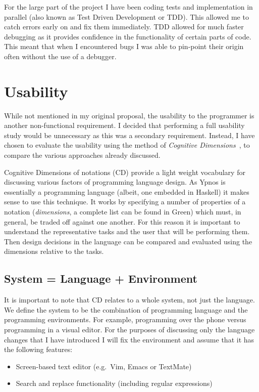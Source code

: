 \documentclass[12pt,a4paper,twoside]{scrbook}
\begin{document}
For the large part of the project I have been coding tests and
implementation in parallel (also known as Test Driven Development or
TDD). This allowed me to catch errors early on and fix them immediately.
TDD allowed for much faster debugging as it provides confidence in the
functionality of certain parts of code. This meant that when I
encountered bugs I was able to pin-point their origin often without the
use of a debugger.

\section{Usability}

While not mentioned in my original proposal, the usability to the programmer is
another non-functional requirement. I decided that performing a full usability
study would be unnecessary as this was a secondary requirement. Instead, I have
chosen to evaluate the usability using the method of \emph{Cognitive
  Dimensions}~\cite{green96}, to compare the various approaches already
discussed.

Cognitive Dimensions of notations (CD) provide a light weight vocabulary for
discussing various factors of programming language design. As Ypnos is
essentially a programming language (albeit, one embedded in Haskell) it makes
sense to use this technique. It works by specifying a number of properties of a
notation (\emph{dimensions}, a complete list can be found in
Green\cite{green96}) which must, in general, be traded off against one
another. For this reason it is important to understand the representative tasks
and the user that will be performing them. Then design decisions in the language
can be compared and evaluated using the dimensions relative to the tasks.

\subsection{System = Language + Environment}

It is important to note that CD relates to a whole system, not just the
language. We define the system to be the combination of programming language and
the programming environments. For example, programming over the phone versus
programming in a visual editor. For the purposes of discussing only the language
changes that I have introduced I will fix the environment and assume that it has
the following features:

\begin{itemize}
\item
  Screen-based text editor (e.g.~Vim, Emacs or TextMate)
\item
  Search and replace functionality (including regular expressions)
\end{itemize}
\end{document}
